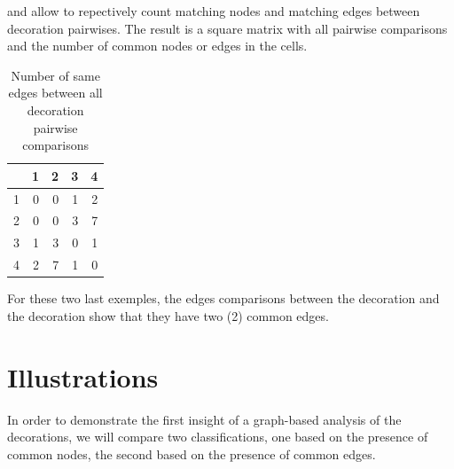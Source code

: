 \documentclass[article]{jss}\usepackage{knitr}
\begin{document}
 and  allow to repectively count matching nodes and matching edges between decoration pairwises. The result is a square matrix with all pairwise comparisons and the number of common nodes or edges in the cells.

\begin{kframe}
\begin{alltt}
 \hlkwb{<-} \hlstd{)}
 \hlkwb{<-} 
\hlopt{::}
\hlstd{+ }                      
\hlstd{+ }                      \hlstd{=} \hlstd{,}
\hlstd{+ }                      \hlstd{=} \hlstd{,}
\hlstd{+ }                      \hlstd{=} \hlstd{(}\hlstd{)),}
\hlstd{+ }      \hlstd{=}\hlstd{,}
\hlstd{+ }       \hlstd{=} \hlstd{)}
\end{alltt}
\end{kframe}%
\begin{table}[H]
\centering
\begin{tabular}{rrrrr}
  \hline
 & 1 & 2 & 3 & 4 \\ 
  \hline
1 & 0 & 0 & 1 & 2 \\ 
  2 & 0 & 0 & 3 & 7 \\ 
  3 & 1 & 3 & 0 & 1 \\ 
  4 & 2 & 7 & 1 & 0 \\ 
   \hline
\end{tabular}
\caption{Number of same edges between all decoration pairwise comparisons} 
\label{Test_table_2}
\end{table}


For these two last exemples, the edges comparisons between the decoration  and the decoration  show that they have two (2) common edges.

\section{Illustrations} \label{sec:illustrations}

In order to demonstrate the first insight of a graph-based analysis of the decorations, we will compare two classifications, one based on the presence of common nodes, the second based on the presence of common edges. 
\end{document}
